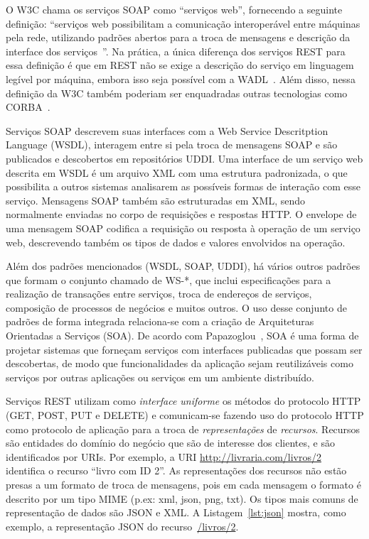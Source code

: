 O W3C chama os serviços SOAP como ``serviços web'', fornecendo a seguinte definição: ``serviços web possibilitam a comunicação interoperável entre máquinas pela rede, utilizando padrões abertos para a troca de mensagens e descrição da interface dos serviços~\cite{W3C2004WS}''. Na prática, a única diferença dos serviços REST para essa definição é que em REST não se exige a descrição do serviço em linguagem legível por máquina, embora isso seja possível com a WADL~\cite{WADL2006}. Além disso, nessa definição da W3C também poderiam ser enquadradas outras tecnologias como CORBA~\cite{CORBA1995}. 

Serviços SOAP descrevem suas interfaces com a Web Service Descritption Language (WSDL), interagem entre si pela troca de mensagens SOAP e são publicados e descobertos em repositórios UDDI. Uma interface de um serviço web descrita em WSDL é um arquivo XML com uma estrutura padronizada, o que possibilita a outros sistemas analisarem as possíveis formas de interação com esse serviço. Mensagens SOAP também são estruturadas em XML, sendo normalmente enviadas no corpo de requisições e respostas HTTP. O envelope de uma mensagem SOAP codifica a requisição ou resposta à operação de um serviço web, descrevendo também os tipos de dados e valores envolvidos na operação. 

Além dos padrões mencionados (WSDL, SOAP, UDDI), há vários outros padrões que formam o conjunto chamado de WS-*, que inclui especificações para a realização de transações entre serviços, troca de endereços de serviços, composição de processos de negócios e muitos outros. O uso desse conjunto de padrões de forma integrada relaciona-se com a criação de Arquiteturas Orientadas a Serviços (SOA). De acordo com Papazoglou~\cite{Papazoglou2007State}, SOA é uma forma de projetar sistemas que forneçam serviços com interfaces publicadas que possam ser descobertas, de modo que funcionalidades da aplicação sejam reutilizáveis como serviços por outras aplicações ou serviços em um ambiente distribuído. 

Serviços REST utilizam como \emph{interface uniforme} os métodos do protocolo HTTP (GET, POST, PUT e DELETE) e comunicam-se fazendo uso do protocolo HTTP como protocolo de aplicação para a troca de \emph{representações} de \emph{recursos}. 
Recursos são entidades do domínio do negócio que são de interesse dos clientes, e são identificados por URIs. Por exemplo, a URI \url{http://livraria.com/livros/2} identifica o recurso ``livro com ID 2''. 
As representações dos recursos não estão presas a um formato de troca de mensagens, pois em cada mensagem o formato é descrito por um tipo MIME (p.ex: xml, json, png, txt). Os tipos mais comuns de representação de dados são JSON e XML. A Listagem~\ref{lst:json} mostra, como exemplo, a representação JSON do recurso~\url{/livros/2}.

